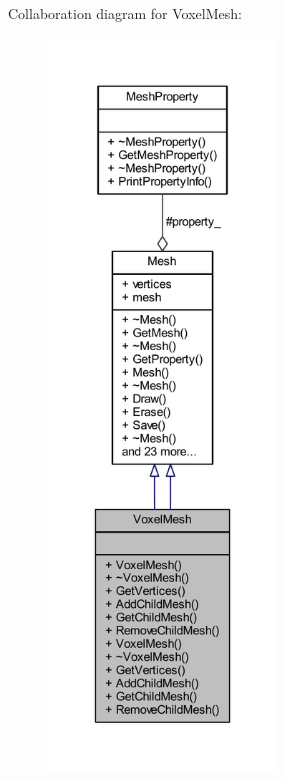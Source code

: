 Collaboration diagram for Voxel\+Mesh\+:
\nopagebreak
\begin{figure}[H]
\begin{center}
\leavevmode
\includegraphics[height=550pt]{class_voxel_mesh__coll__graph}
\end{center}
\end{figure}

